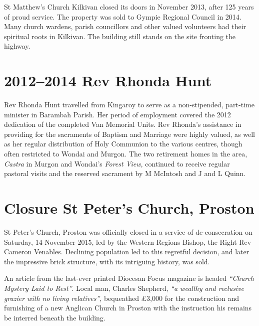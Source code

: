 St Matthew's Church Kilkivan closed its doors in November 2013, after 125 years of proud service. The property was sold to Gympie Regional Council in 2014. Many church wardens, parish councillors and other valued volunteers had their spiritual roots in Kilkivan. The building still stands on the site fronting the highway.



\section{2012--2014 Rev Rhonda Hunt}



Rev Rhonda Hunt travelled from Kingaroy to serve as a non-stipended, part-time minister in Barambah Parish. Her period of employment covered the 2012 dedication of the completed Van Memorial Units. Rev Rhonda's assistance in providing for the sacraments of Baptism and Marriage were highly valued, as well as her regular distribution of Holy Communion to the various centres, though often restricted to Wondai and Murgon. The two retirement homes in the area, \emph{Castra} in Murgon and Wondai's \emph{Forest View}, continued to receive regular pastoral visits and the reserved sacrament by M McIntosh and J and L Quinn.



\section{Closure St Peter's Church, Proston}



St Peter's Church, Proston was officially closed in a service of de-consecration on Saturday, 14 November 2015, led by the Western Regions Bishop, the Right Rev Cameron Venables. Declining population led to this regretful decision, and later the impressive brick structure, with its intriguing history, was sold.



An article from the last-ever printed Diocesan Focus magazine is headed \emph{``Church Mystery Laid to Rest''}. Local man, Charles Shepherd, \emph{``a wealthy and reclusive grazier with no living relatives''}, bequeathed \pounds3,000 for the construction and furnishing of a new Anglican Church in Proston with the instruction his remains be interred beneath the building.



